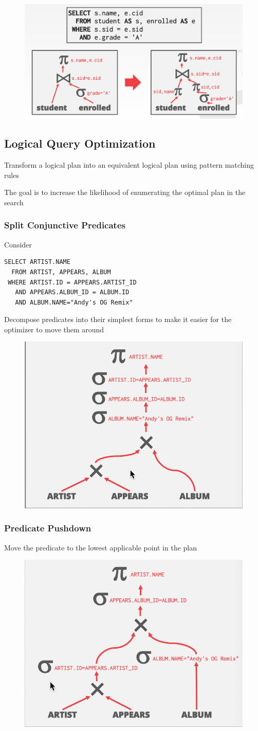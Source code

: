 \documentclass[11pt]{article}
\begin{document}
\begin{figure}[htbp]
\centering
\includegraphics[width=.5\textwidth]{../images/15445/38.png}
\label{}
\end{figure}
\subsection{Logical Query Optimization}
\label{sec:org0b4fdf2}
Transform a logical plan into an equivalent logical plan using pattern matching rules

The goal is to increase the likelihood of enumerating the optimal plan in the search
\subsubsection{Split Conjunctive Predicates}
\label{sec:org813b387}
Consider
\begin{verbatim}
SELECT ARTIST.NAME
  FROM ARTIST, APPEARS, ALBUM
 WHERE ARTIST.ID = APPEARS.ARTIST_ID
   AND APPEARS.ALBUM_ID = ALBUM.ID
   AND ALBUM.NAME="Andy's OG Remix"
\end{verbatim}

Decompose predicates into their simplest forms to make it easier for the optimizer to move them
around
\begin{figure}[htbp]
\centering
\includegraphics[width=.4\textwidth]{../images/15445/39.png}
\label{}
\end{figure}
\subsubsection{Predicate Pushdown}
\label{sec:org3de8dcf}
Move the predicate to the lowest applicable point in the plan
\begin{figure}[htbp]
\centering
\includegraphics[width=.5\textwidth]{../images/15445/40.png}
\label{}
\end{figure}
\end{document}
